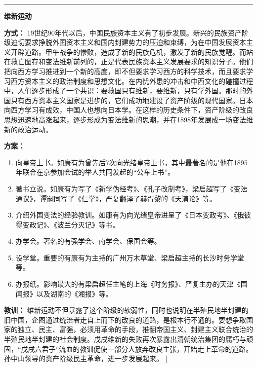 \begin{enumerate}
		\bigskip
		\hrule
		\bigskip
		{\begin{center}\textbf{维新运动}\end{center}}\par
			\textbf{方式：}  19世纪90年代以后，中国民族资本主义有了初步发展。新兴的民族资产阶级迫切要求挣脱外国资本主义和国内封建势力的压迫和束缚，为在中国发展资本主义开辟道路。甲午战争的惨败，造成了新的民族危机，激发了新的民族觉醒。而站在救亡图存和变法维新前列的，正是代表民族资本主义发展要求的知识分子。他们把向西方学习推进到一个新的高度，即不但要求学习西方的科学技术，而且要求学习西方资本主义的政治制度和思想文化。在内忧外患的冲击和中西文化的碰撞过程中，人们逐步形成了一个共识：要救国只有维新，要维新，只有学外国。那时的外国只有西方资本主义国家是进步的，它们成功地建设了资产阶级的现代国家。日本向西方学习有成效，中国人也想向日本学。在这样的历史条件下，资产阶级的改良思想迅速地高涨起来，逐步形成为变法维新的思潮，并在1898年发展成一场变法维新的政治运动。\par
			\textbf{方案：} \begin{enumerate}
				\item 向皇帝上书。如康有为曾先后7次向光绪皇帝上书，其中最著名的是他在1895年联合在京参加会试的举人共同发起的“公车上书”。
				\item 著书立说。如康有为写了《新学伪经考》、《孔子改制考》，梁启超写了《变法通议》，谭嗣同写了《仁学》，严复翻译了赫胥黎的《天演论》等。
				\item 介绍外国变法的经验教训。如康有为向光绪皇帝进呈了《日本变政考》、《俄彼得变政记》、《波兰分灭记》等书。
				\item 办学会。著名的有强学会、南学会、保国会等。
				\item 设学堂。重要的有康有为主持的广州万木草堂、梁启超主持的长沙时务学堂等。
				\item 办报纸。影响最大的有梁启超任主笔的上海《时务报》、严复主办的天津《国闻报》以及湖南的《湘报》等。\end{enumerate} \par
			\textbf{教训：} 维新运动不但暴露了这个阶级的软弱性，同时也说明在半殖民地半封建的旧中国，企图通过统治者走自上而下的改良的道路，是根本行不通的。要想争取国家的独立、民主、富强，必须用革命的手段，推翻帝国主义、封建主义联合统治的半殖民地半封建的社会制度。戊戌维新的失败再次暴露出清朝统治集团的腐朽与顽固，“戊戌六君子”流血的教训促使一部分人放弃改良主张，开始走上革命的道路。孙中山领导的资产阶级民主革命，进一步发展起来。
	]
	
	\question[试述近代以来中国人学习西方的努力屡遭失败的原因。]
	\unsolve
	

\end{enumerate}
